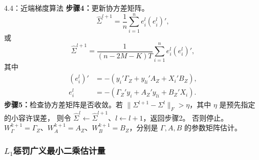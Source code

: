 \begin{bookalgorithm}{4.4：近端梯度算法}
\textbf{步骤4：}更新协方差矩阵。
\begin{equation}
\widehat\Sigma^{l+1}=\frac1n\sum_{i=1}^{n}e_i^l(e_i^l)',\tag{4.223}
\end{equation}
或
\begin{equation}
\widehat\Sigma^{l+1}=\frac{1}{(n-2M-K)T}\sum_{i=1}^{n}e_i^l(e_i^l)',\tag{4.224}
\end{equation}
其中
\[
\begin{aligned}
(e_i^l)'&=-(y_i'\Gamma_Z+y_{li}'A_Z+X_i'B_Z),\\
e_i^l&=-(\Gamma_Z'y_i+A_Z'y_{li}+B_Z'X_i).
\end{aligned}
\]
\textbf{步骤5：}检查协方差矩阵是否收敛。若
$\|\Sigma^{l+1}-\Sigma^l\|_F>\eta$，其中 $\eta$ 是预先指定的小容许误差，
则令 $\widehat\Sigma^l\leftarrow\widehat\Sigma^{l+1}$、$l\leftarrow l+1$，返回步骤2。
否则停止。$W_\Gamma^{k+1}=\Gamma_Z$、$W_A^{k+1}=A_Z$、$W_B^{k+1}=B_Z$，分别是 $\Gamma,A,B$ 的参数矩阵估计。
\end{bookalgorithm}

\subsubsection{\texorpdfstring{$L_1$}{L1}惩罚广义最小二乘估计量}

